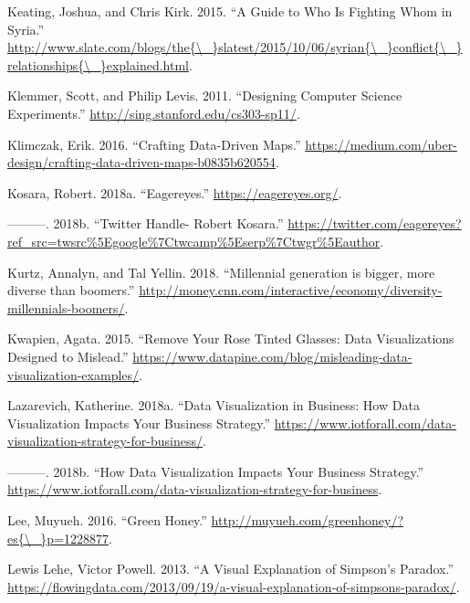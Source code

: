 \documentclass[]{book}
\theoremstyle{definition}
\theoremstyle{definition}
\theoremstyle{definition}
\theoremstyle{remark}
\begin{document}
\hypertarget{ref-syria_chart}{}
Keating, Joshua, and Chris Kirk. 2015. ``A Guide to Who Is Fighting Whom
in Syria.''
\href{http://www.slate.com/blogs/the\%7B/_\%7Dslatest/2015/10/06/syrian\%7B/_\%7Dconflict\%7B/_\%7Drelationships\%7B/_\%7Dexplained.html}{http://www.slate.com/blogs/the\{\textbackslash{}\_\}slatest/2015/10/06/syrian\{\textbackslash{}\_\}conflict\{\textbackslash{}\_\}relationships\{\textbackslash{}\_\}explained.html}.

\hypertarget{ref-stanford_course}{}
Klemmer, Scott, and Philip Levis. 2011. ``Designing Computer Science
Experiments.'' \url{http://sing.stanford.edu/cs303-sp11/}.

\hypertarget{ref-uber_maps}{}
Klimczak, Erik. 2016. ``Crafting Data-Driven Maps.''
\url{https://medium.com/uber-design/crafting-data-driven-maps-b0835b620554}.

\hypertarget{ref-eagereyes_viz}{}
Kosara, Robert. 2018a. ``Eagereyes.'' \url{https://eagereyes.org/}.

\hypertarget{ref-twitter_Kosara}{}
---------. 2018b. ``Twitter Handle- Robert Kosara.''
\url{https://twitter.com/eagereyes?ref_src=twsrc\%5Egoogle\%7Ctwcamp\%5Eserp\%7Ctwgr\%5Eauthor}.

\hypertarget{ref-age_groups}{}
Kurtz, Annalyn, and Tal Yellin. 2018. ``Millennial generation is bigger,
more diverse than boomers.''
\url{http://money.cnn.com/interactive/economy/diversity-millennials-boomers/}.

\hypertarget{ref-misleading_data}{}
Kwapien, Agata. 2015. ``Remove Your Rose Tinted Glasses: Data
Visualizations Designed to Mislead.''
\url{https://www.datapine.com/blog/misleading-data-visualization-examples/}.

\hypertarget{ref-strategy_impact}{}
Lazarevich, Katherine. 2018a. ``Data Visualization in Business: How Data
Visualization Impacts Your Business Strategy.''
\url{https://www.iotforall.com/data-visualization-strategy-for-business/}.

\hypertarget{ref-biz_strategy}{}
---------. 2018b. ``How Data Visualization Impacts Your Business
Strategy.''
\url{https://www.iotforall.com/data-visualization-strategy-for-business}.

\hypertarget{ref-green_honey}{}
Lee, Muyueh. 2016. ``Green Honey.''
\href{http://muyueh.com/greenhoney/?es\%7B/_\%7Dp=1228877}{http://muyueh.com/greenhoney/?es\{\textbackslash{}\_\}p=1228877}.

\hypertarget{ref-simpson_paradox}{}
Lewis Lehe, Victor Powell. 2013. ``A Visual Explanation of Simpson's
Paradox.''
\url{https://flowingdata.com/2013/09/19/a-visual-explanation-of-simpsons-paradox/}.
\end{document}
